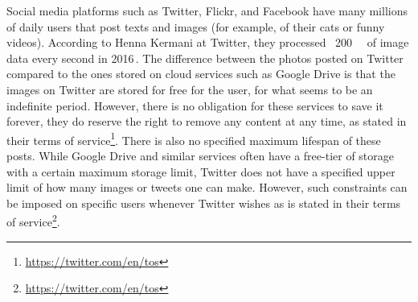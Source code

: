 Social media platforms such as Twitter, Flickr, and Facebook have many millions of daily users that post texts and images (for example, of their cats or funny videos). According to Henna Kermani at Twitter, they processed ~\SI{200}{\giga\byte} of image data every second in 2016\,\cite{MobileScaleLondona}. The difference between the photos posted on Twitter compared to the ones stored on cloud services such as Google Drive is that the images on Twitter are stored for free for the user, for what seems to be an indefinite period. However, there is no obligation for these services to save it forever, they do reserve the right to remove any content at any time, as stated in their terms of service\footnote{\url{https://twitter.com/en/tos}}. There is also no specified maximum lifespan of these posts. While Google Drive and similar services often have a free-tier of storage with a certain maximum storage limit, Twitter does not have a specified upper limit of how many images or tweets one can make. However, such constraints can be imposed on specific users whenever Twitter wishes as is stated in their terms of service\footnote{\url{https://twitter.com/en/tos}}.













